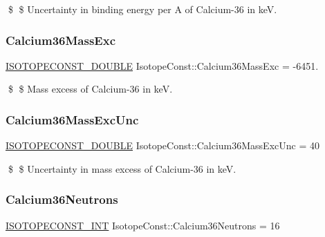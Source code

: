 \$ \$ Uncertainty in binding energy per A of Calcium-\/36 in keV. \mbox{\label{group___isotope_const-_calcium-_ca36_ga3648b3abe715edff677c29c034abfb52}} 
\subsubsection{\texorpdfstring{Calcium36\+Mass\+Exc}{Calcium36MassExc}}
{\footnotesize\ttfamily \mbox{\hyperlink{group___isotope_const-_macros_ga8f45a7272ce02c0b4c65c44636ed719a}{I\+S\+O\+T\+O\+P\+E\+C\+O\+N\+S\+T\+\_\+\+D\+O\+U\+B\+LE}} Isotope\+Const\+::\+Calcium36\+Mass\+Exc = -\/6451.}

\$ \$ Mass excess of Calcium-\/36 in keV. \mbox{\label{group___isotope_const-_calcium-_ca36_gaf8096a875b331b1d7355a9e9f2313a27}} 
\subsubsection{\texorpdfstring{Calcium36\+Mass\+Exc\+Unc}{Calcium36MassExcUnc}}
{\footnotesize\ttfamily \mbox{\hyperlink{group___isotope_const-_macros_ga8f45a7272ce02c0b4c65c44636ed719a}{I\+S\+O\+T\+O\+P\+E\+C\+O\+N\+S\+T\+\_\+\+D\+O\+U\+B\+LE}} Isotope\+Const\+::\+Calcium36\+Mass\+Exc\+Unc = 40}

\$ \$ Uncertainty in mass excess of Calcium-\/36 in keV. \mbox{\label{group___isotope_const-_calcium-_ca36_gad0b2d03d20b2c41c7a81f0060f03a88f}} 
\subsubsection{\texorpdfstring{Calcium36\+Neutrons}{Calcium36Neutrons}}
{\footnotesize\ttfamily \mbox{\hyperlink{group___isotope_const-_macros_ga5f18360b3e99483a35c32d789e62621c}{I\+S\+O\+T\+O\+P\+E\+C\+O\+N\+S\+T\+\_\+\+I\+NT}} Isotope\+Const\+::\+Calcium36\+Neutrons = 16}

